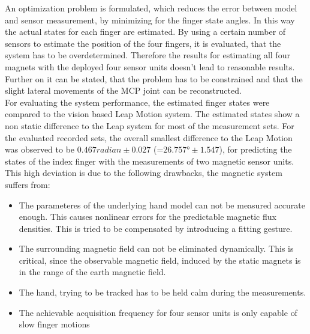 An optimization problem is formulated, which reduces the error between model and sensor measurement, by minimizing for the finger state angles. In this way the actual states for each finger are estimated. By using a certain number of sensors to estimate the position of the four fingers, it is evaluated, that the system has to be overdetermined. Therefore the results for estimating all four magnets with the deployed four sensor units doesn't lead to reasonable results. Further on it can be stated, that the problem has to be constrained and that the slight lateral movements of the \ac{MCP} joint can be reconstructed.\\
For evaluating the system performance, the estimated finger states were compared to the vision based Leap Motion system. The estimated states show a non static difference to the Leap system for most of the measurement sets. 
For the evaluated recorded sets, the overall smallest difference to the Leap Motion was observed to be $ 0.467 \si{radian} \pm 0.027 $ (=$ 26.757 \si{\degree} \pm 1.547 $), for predicting the states of the index finger with the measurements of two magnetic sensor units. This high deviation is due to the following drawbacks, the magnetic system suffers from:
\begin{itemize}
\item The parameteres of the underlying hand model can not be measured accurate enough. This causes nonlinear errors for the predictable magnetic flux densities. This is tried to be compensated by introducing a fitting gesture.
\item The surrounding magnetic field can not be eliminated dynamically. This is critical, since the observable magnetic field, induced by the static magnets is in the range of the earth magnetic field.
\item The hand, trying to be tracked has to be held calm during the measurements.
\item The achievable acquisition frequency for four sensor units is only capable of slow finger motions
\end{itemize} 

